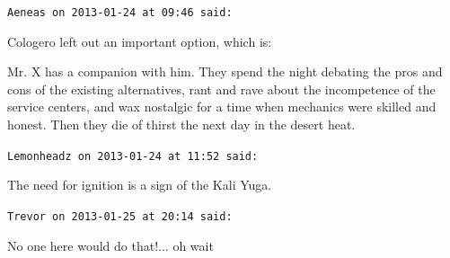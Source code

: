 \begin{footnotesize}
\begin{sffamily}
\hfill

\texttt{Aeneas on 2013-01-24 at 09:46 said:}

Cologero left out an important option, which is:

Mr. X has a companion with him. They spend the night debating the pros and cons of the existing alternatives, rant and rave about the incompetence of the service centers, and wax nostalgic for a time when mechanics were skilled and honest. Then they die of thirst the next day in the desert heat.

\hfill

\texttt{Lemonheadz on 2013-01-24 at 11:52 said:}

The need for ignition is a sign of the Kali Yuga.

\hfill

\texttt{Trevor on 2013-01-25 at 20:14 said:}

No one here would do that!... oh wait


\hfill

\end{sffamily}
\end{footnotesize}

